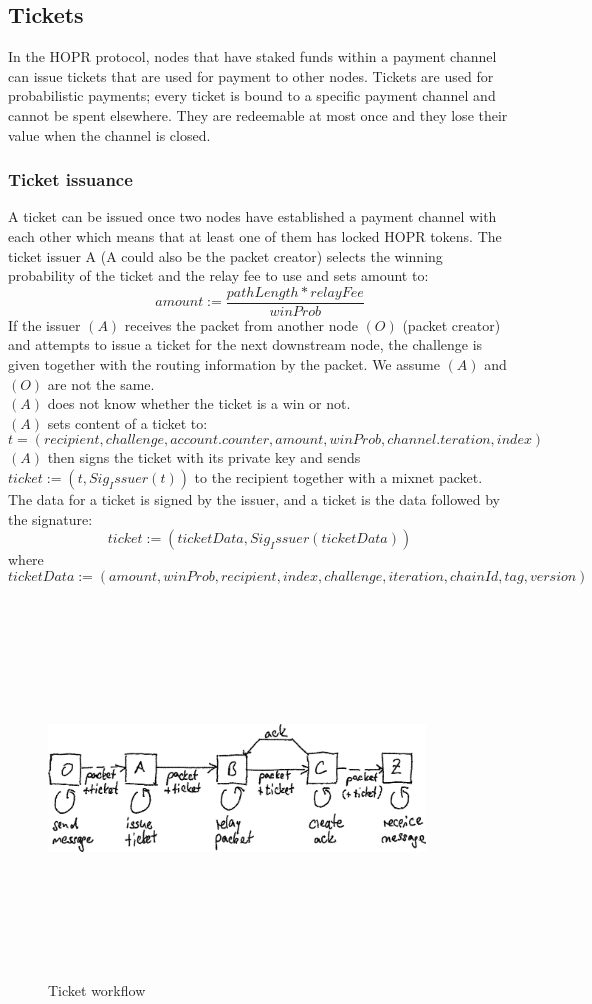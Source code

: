 \subsection{Tickets}
In the HOPR protocol, nodes that have staked funds within a payment channel can issue tickets that are used for payment to other nodes. 
Tickets are used for probabilistic payments; every ticket is bound to a specific payment channel and cannot be spent elsewhere. 
They are redeemable at most once and they lose their value when the channel is closed. 
\subsubsection{Ticket issuance}
A ticket can be issued once two nodes have established a payment channel with each other which means that at least one of them has locked HOPR tokens.
\newline The ticket issuer A (A could also be the packet creator) selects the winning probability of the ticket and the relay fee to use and sets amount to:
$$amount:=\dfrac{pathLength*relayFee}{winProb}$$
If the issuer $(A)$ receives the packet from another node $(O)$ (packet creator) and attempts to issue a ticket for the next downstream node, 
the challenge is given together with the routing information by the packet. We assume $(A)$ and $(O)$ are not the same.
\\$(A)$ does not know whether the ticket is a win or not.
\\$(A)$ sets content of a ticket to: $$t=(recipient, challenge, account.counter, amount, winProb, channel.teration, index)$$ 
$(A)$ then signs the ticket with its private key and sends $ticket:= (t, Sig_Issuer(t))$ to the recipient together with a mixnet packet.
\\The data for a ticket is signed by the issuer, and a ticket is the data followed by the signature: $$ticket:=(ticketData,Sig_Issuer(ticketData))$$ where 
    $$ticketData:=(amount,winProb,recipient,index,challenge,iteration,chainId,tag,version)$$
 \begin{figure}
    \centering
    \includegraphics[width=10cm,height=10cm,keepaspectratio]{../whitepaper/images/ticket_workflow.png}
    \caption{Ticket workflow}
    \label{fig:Ticket worklow}
\end{figure}

